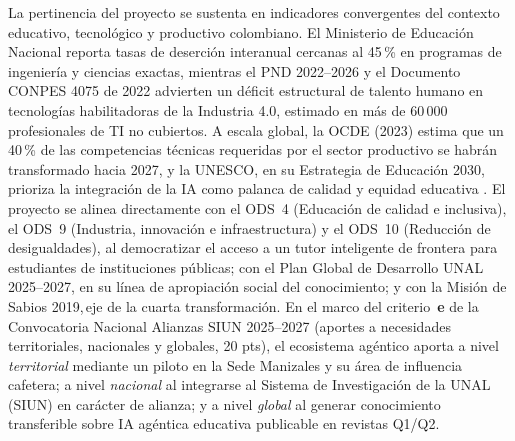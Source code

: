 

La pertinencia del proyecto se sustenta en indicadores convergentes del contexto educativo, tecnológico y productivo colombiano. El Ministerio de Educación Nacional reporta tasas de deserción interanual cercanas al 45\,\% en programas de ingeniería y ciencias exactas, mientras el PND 2022--2026 y el Documento CONPES 4075 de 2022 advierten un déficit estructural de talento humano en tecnologías habilitadoras de la Industria 4.0, estimado en más de 60\,000 profesionales de TI no cubiertos. A escala global, la OCDE (2023) estima que un 40\,\% de las competencias técnicas requeridas por el sector productivo se habrán transformado hacia 2027, y la UNESCO, en su Estrategia de Educación 2030, prioriza la integración de la IA como palanca de calidad y equidad educativa \cite{unesco2023aied}. El proyecto se alinea directamente con el ODS~4 (Educación de calidad e inclusiva), el ODS~9 (Industria, innovación e infraestructura) y el ODS~10 (Reducción de desigualdades), al democratizar el acceso a un tutor inteligente de frontera para estudiantes de instituciones públicas; con el Plan Global de Desarrollo UNAL 2025--2027, en su línea de apropiación social del conocimiento; y con la Misión de Sabios 2019,\,eje de la cuarta transformación. En el marco del criterio~\textbf{e} de la Convocatoria Nacional Alianzas SIUN 2025--2027 (aportes a necesidades territoriales, nacionales y globales, 20 pts), el ecosistema agéntico aporta a nivel \emph{territorial} mediante un piloto en la Sede Manizales y su área de influencia cafetera; a nivel \emph{nacional} al integrarse al Sistema de Investigación de la UNAL (SIUN) en carácter de alianza; y a nivel \emph{global} al generar conocimiento transferible sobre IA agéntica educativa publicable en revistas Q1/Q2.


